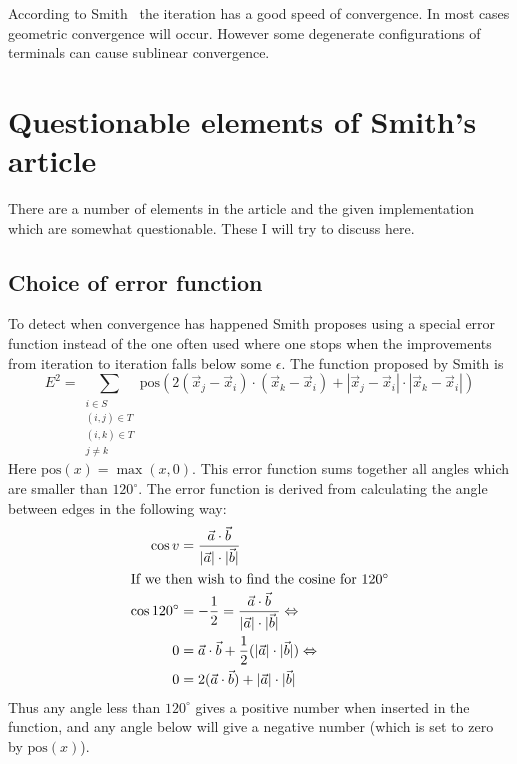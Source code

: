 According to Smith~\cite[p.~150]{smith1992} the iteration has a good speed of
convergence. In most cases geometric convergence will occur. However some
degenerate configurations of terminals can cause sublinear convergence.


\section{Questionable elements of Smith's article}
\label{sec:quest-elem-smiths}

There are a number of elements in the article and the given
implementation~\cite{smith1992} which are somewhat questionable. These I will
try to discuss here.

\subsection{Choice of error function}
\label{sec:choice-error-funct}

To detect when convergence has happened Smith proposes using a special
error function instead of the one often used where one stops when the
improvements from iteration to iteration falls below some $\epsilon$. The
function proposed by Smith is
%
\begin{equation}
  E^2 = \sum_{
    \begin{array}{c} i \in S \\ (i,j) \in T \\ (i,k) \in T \\ j \ne k
    \end{array}} \text{pos} (2 (\vec x_j - \vec x_i) \cdot (\vec x_k - \vec x_i)
+ | \vec x_j - \vec x_i | \cdot | \vec x_k - \vec x_i |)
\end{equation}
%
Here $\text{pos}(x) = \max(x, 0)$. This error function sums together all angles which
are smaller than $120^{\circ}$. The error function is derived from calculating
the angle between edges in the following way:
%
\begin{align}
  \cos v & = \frac{\vec a \cdot \vec b}
    {|\vec a| \cdot |\vec b|}                 \\
  \intertext{If we then wish to find the cosine for $120^{\circ}$}
  \cos 120^{\circ}
         & = -\frac{1}{2} = \frac{\vec a \cdot \vec b}
    {|\vec a| \cdot |\vec b|} \Leftrightarrow \\
  0      & = \vec a \cdot \vec b + \frac{1}{2}
    (|\vec a| \cdot |\vec b|) \Leftrightarrow \\
  0      & = 2 (\vec a \cdot \vec b) + |\vec a| \cdot |\vec b|
\end{align}
%
Thus any angle less than $120^{\circ}$ gives a positive number when inserted in
the function, and any angle below will give a negative number (which is set to
zero by $\text{pos}(x)$).

